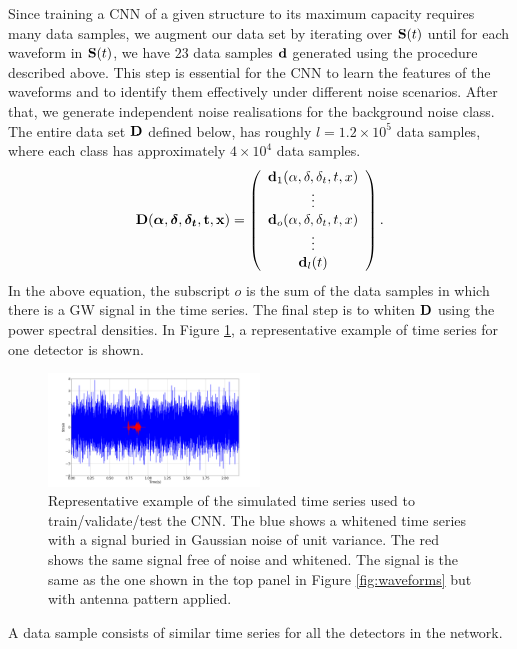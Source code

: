 \documentclass[aps,twocolumn,showpacs,groupedaddress, nofootinbib]{revtex4}  %
\begin{document}
Since training a \ac{CNN} of a given structure to its maximum capacity requires many data samples, we augment our data set by iterating over $\bold{S}(t)$ until 
for each waveform in $\bold{S}(t)$, we have $23$ data samples $\bold{d}$ generated using the procedure described above.
This step is essential for the \ac{CNN} to learn the features of the waveforms and to identify them effectively under different noise scenarios.
After that, we generate independent noise realisations for the background noise class.
The entire data set $\bold{D}$ defined below, has roughly $l = 1.2 \times 10^{5}$ data samples, where each class has approximately $4\times10^{4}$ data samples.
\begin{equation}\label{eq:finaldata}
\bold{D}(\boldsymbol{\alpha}, \boldsymbol{\delta}, \boldsymbol{\delta_t}, \bold{t}, \bold{x}) =  \left(\begin{array}{c}
\bold{d}_1(\alpha, \delta, \delta_t, t, x) \\
\vdots \\
\bold{d}_o(\alpha, \delta, \delta_t, t, x) \\
\vdots \\
\bold{d}_l(t) \\
\end{array}\right).
\end{equation}
In the above equation, the subscript $o$ is the sum of the data samples in which there is a \ac{GW} signal in the time series. 
The final step is to whiten $\bold{D}$ using the power spectral densities.
In Figure \ref{fig:sample}, a representative example  of time series for one detector is shown. 
\begin{figure}
\includegraphics[width=0.5\textwidth]{datasample.png}
\caption{Representative example of the simulated time series used to train/validate/test the \ac{CNN}.
The blue shows a whitened time series with a signal buried in Gaussian noise of unit variance.
The red shows the same signal free of noise and whitened. The signal is the same as the one shown in the top panel in Figure \ref{fig:waveforms} but with antenna pattern applied. 
\label{fig:sample}}
\end{figure}
A data sample consists of similar time series for all the detectors in the network.
\end{document}
